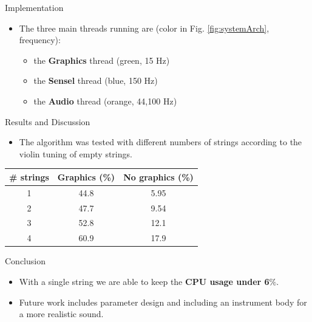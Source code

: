 \documentclass[a0paper,portrait]{baposter}
\let\oldbf\textbf
\renewcommand{\textbf}[1]{\textcolor{aaublue1}{\oldbf{#1}}}
\begin{document}
\begin{poster}
\begin{posterbox}[name=implementation,column=2,row=0]{Implementation}
\begin{itemize}
\begin{itemize}
        \item the \textbf{main application class} that moderates between these and the auditory and visual outputs.
    \end{itemize}
    \item The three main threads running are (color in Fig. \ref{fig:systemArch}, frequency):
    \begin{itemize}
        \item the \textbf{Graphics} thread (green, 15 Hz)
        \item the \textbf{Sensel} thread (blue, 150 Hz)
        \item the \textbf{Audio} thread (orange, 44,100 Hz)
    \end{itemize}
\end{itemize}
\end{posterbox}

\begin{posterbox}[name=discussion,column=2,below=implementation]{Results and Discussion}
\begin{itemize}
    \item The algorithm was tested with different numbers of strings according to the violin tuning of empty strings. 
\end{itemize}
\vspace{-1.6em}
  \begin{center}
	\centering
  \begin{tabular}{|c|c|c|}\hline
   
   \# strings & Graphics (\%) & No graphics (\%)\\
    \hline
    1 & 44.8 & 5.95\\
    2 & 47.7 & 9.54\\
    3 & 52.8 & 12.1 \\
    4 & 60.9 & 17.9\\
    \hline
 \end{tabular}
  \label{tab:results}
\end{center}
\end{posterbox}

\begin{posterbox}[name=conclusion,column=2,below=discussion]{Conclusion}
  \begin{itemize}
    \item With a single string we are able to keep the \textbf{CPU usage under 6$\mathbf{\%}$}.
    \item Future work includes parameter design and including an instrument body for a more realistic sound. 
  \end{itemize}
\end{posterbox}


\end{poster}
\end{document}
